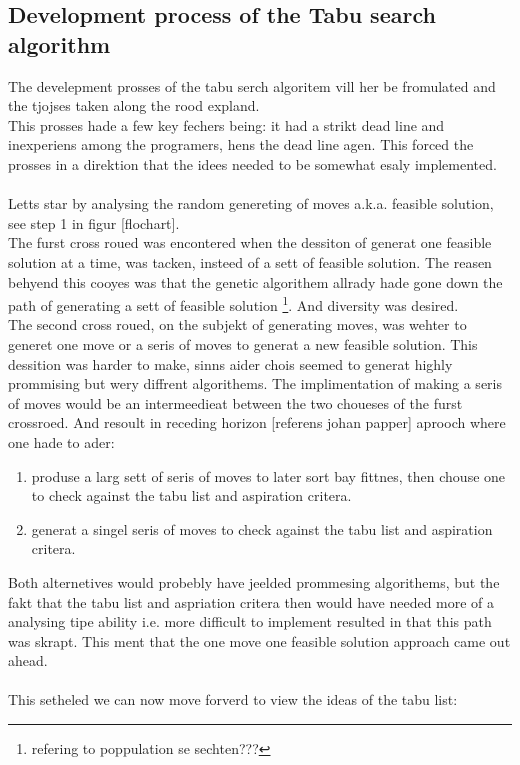 \subsection{Development process of the Tabu search algorithm}
The develepment prosses of the tabu serch algoritem vill her be fromulated and the tjojses taken along the rood expland.\\
This prosses hade a few key fechers being: it had a strikt dead line and inexperiens among the programers, hens the dead line agen. This forced the prosses in a direktion that the idees needed to be somewhat esaly implemented. \\
\\
Letts star by analysing the random genereting of moves a.k.a. feasible solution, see step 1 in figur [flochart].\\
The furst cross roued was encontered when the dessiton of generat one feasible solution at a time, was tacken, insteed of a sett of feasible solution. The reasen behyend this cooyes was that the genetic algorithem allrady hade gone down the path of generating a sett of feasible solution \footnote{ refering to poppulation se sechten???}. And diversity was desired.\\
The second cross roued, on the subjekt of generating moves, was wehter to generet one move or a seris of moves to generat a new feasible solution. This dessition was harder to make, sinns aider chois seemed to generat highly prommising but wery diffrent algorithems. The implimentation of making a seris of moves would be an intermeedieat between the two choueses of the furst crossroed. And resoult in receding horizon [referens johan papper] aprooch where one hade to ader:
\begin{enumerate}
\item produse a larg sett of seris of moves to later sort bay fittnes, then chouse one to check against the tabu list and aspiration critera.
\item generat a singel seris of moves to check against the tabu list and aspiration critera.
\end{enumerate}
Both alternetives would probebly have jeelded prommesing algorithems, but the fakt that the tabu list and aspriation critera then would have needed more of a analysing tipe ability i.e. more difficult to implement resulted in that this path was skrapt. This ment that the one move one feasible solution approach came out ahead.\\
\\
This setheled we can now move forverd to view the ideas of the tabu list:\\
